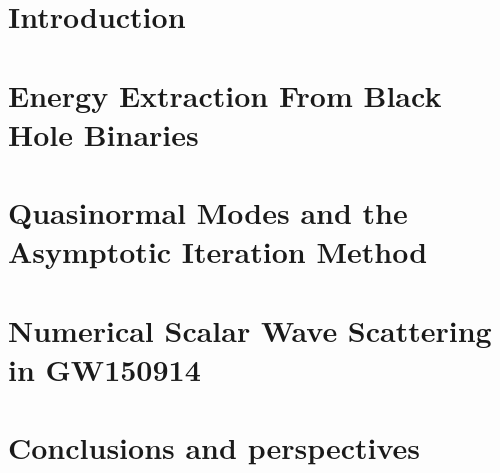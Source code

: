 \documentclass[12pt, twoside]{report}
\newcommand\myclearpage{\cleartooddpage[\thispagestyle{empty}]}
\begin{document}
\chapter{Introduction}
\label{ch:introduction}


\myclearpage
\par

\chapter{Energy Extraction From Black Hole Binaries}
\label{ch:penrose_binaries}


\myclearpage
\par

\chapter{Quasinormal Modes and the Asymptotic Iteration Method}
\label{ch:qnm_aim}


\myclearpage
\par

\chapter{Numerical Scalar Wave Scattering in GW150914}
\label{ch:wave_scattering}


\myclearpage
\par

\chapter{Conclusions and perspectives}
\label{ch:conclusion}


\myclearpage
\par


%



\end{document}
